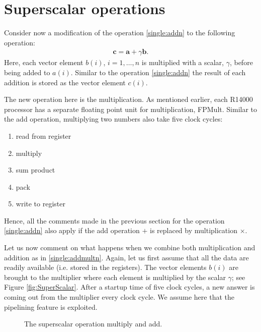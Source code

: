 \section{Superscalar operations}

Consider now a modification of the operation \eqref{single:addn} to the
following operation:
\begin{align}
  \bm c = \bm a + \gamma \bm b.
  \label{single:addmultn}
\end{align}
Here, each vector element $b(i)$, $i=1,\ldots,n$ is multiplied with a scalar,
$\gamma$, before being added to $a(i)$. Similar to the operation
\eqref{single:addn} the result of each addition is stored as the vector element
$c(i)$.

The new operation here is the multiplication. As mentioned earlier, each R14000
processor has a separate floating point unit for multiplication, FPMult. Similar
to the add operation, multiplying two numbers also take five clock cycles:
\begin{enumerate}
\item read from register
\item multiply
\item sum product
\item pack
\item write to register
\end{enumerate}
Hence, all the comments made in the previous section for the operation
\eqref{single:addn} also apply if the add operation $+$ is replaced by
multiplication $\times$.

Let us now comment on what happens when we combine both multiplication and
addition as in \eqref{single:addmultn}. Again, let us first assume that all the
data are readily available (i.e. stored in the registers). The vector elements
$b(i)$ are brought to the multiplier where each element is multiplied by the
scalar $\gamma$; see Figure \autoref{fig:SuperScalar}. After a startup time of
five clock cycles, a new answer is coming out from the multiplier every clock
cycle. We assume here that the pipelining feature is exploited.

\begin{figure}[htbp]
  \centering
  \caption{The superscalar operation multiply and add.}
  \label{fig:SuperScalar}
\end{figure}

